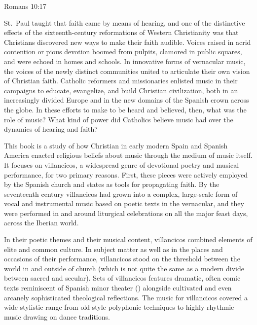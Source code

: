 %

\label{ch:musical-theology}

\epigraph
{}
{Romans 10:17}

St.~Paul taught that faith came by means of hearing, and one of the distinctive effects of the sixteenth-century reformations of Western Christianity was that Christians discovered new ways to make their faith audible.
Voices raised in acrid contention or pious devotion boomed from pulpits, clamored in public squares, and were echoed in homes and schools.
In innovative forms of vernacular music, the voices of the newly distinct communities united to articulate their own vision of Christian faith.
Catholic reformers and missionaries enlisted music in their campaigns to educate, evangelize, and build Christian civilization, both in an increasingly divided Europe and in the new domains of the Spanish crown across the globe.
In these efforts to make  to be heard and believed, then, what was the role of music?
What kind of power did Catholics believe music had over the dynamics of hearing and faith?

This book is a study of how Christian in early modern Spain and Spanish America enacted religious beliefs about music through the medium of music itself.
It focuses on villancicos, a widespread genre of devotional poetry and musical performance, for two primary reasons.
First, these pieces were actively employed by the Spanish church and states as tools for propagating faith.
By the seventeenth century villancicos had grown into a complex, large-scale form of vocal and instrumental music based on poetic texts in the vernacular, and they were performed in and around liturgical celebrations on all the major feast days, across the Iberian world.

In their poetic themes and their musical content, villancicos combined elements of elite and common culture.
In subject matter as well as in the places and occasions of their performance, villancicos stood on the threshold between the world in and outside of church (which is not quite the same as a modern divide between sacred and secular).
Sets of villancicos features dramatic, often comic texts reminiscent of Spanish minor theater () alongside cultivated and even arcanely sophisticated theological reflections.
The music for villancicos covered a wide stylistic range from old-style polyphonic techniques to highly rhythmic music drawing on dance traditions.

